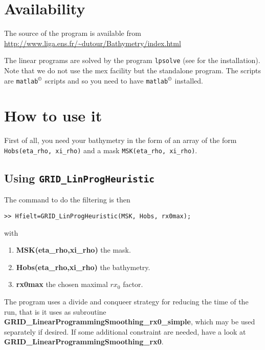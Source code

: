 \documentclass[12pt]{article}
\begin{document}
\section{Availability}

The source of the program is available from \url{http://www.liga.ens.fr/~dutour/Bathymetry/index.html}

The linear programs are solved by the program {\tt lpsolve} (see \cite{lpsolve} for the installation). Note that we do not use the mex facility but the standalone program.
The scripts are {\tt matlab$^{\copyright}$} scripts and so you need to have {\tt matlab$^{\copyright}$} installed.



\section{How to use it}

First of all, you need your bathymetry in the form of an array of the
form {\tt Hobs(eta\_rho, xi\_rho)} and a mask {\tt MSK(eta\_rho, xi\_rho)}.





\subsection{Using {\tt GRID\_LinProgHeuristic}}

The command to do the filtering is then
\begin{verbatim}
>> Hfielt=GRID_LinProgHeuristic(MSK, Hobs, rx0max);
\end{verbatim}
with
\begin{enumerate}
\item {\bf MSK(eta\_rho,xi\_rho)} the mask.
\item {\bf Hobs(eta\_rho,xi\_rho)} the bathymetry.
\item {\bf rx0max} the chosen maximal $rx_0$ factor.
\end{enumerate}
The program uses a divide and conqueer strategy for reducing the time of
the run, that is it uses as subroutine {\bf GRID\_LinearProgrammingSmoothing\_rx0\_simple}, which may be used separately if desired.
If some additional constraint are needed, have a look at 
{\bf GRID\_LinearProgrammingSmoothing\_rx0}.
\end{document}
